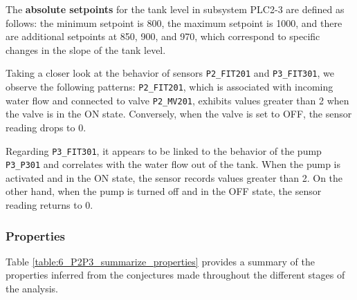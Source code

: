 The \textbf{absolute setpoints} for the tank level in subsystem PLC2-3 are defined as follows: the minimum setpoint is 800, the maximum setpoint is 1000, and there are additional setpoints at 850, 900, and 970, which correspond to specific changes in the slope of the tank level.

\bigskip
Taking a closer look at the behavior of sensors \texttt{P2\_FIT201} and \texttt{P3\_FIT301}, we observe the following patterns: \texttt{P2\_FIT201}, which is associated with incoming water flow and connected to valve \texttt{P2\_MV201}, exhibits values greater than 2 when the valve is in the ON state. Conversely, when the valve is set to OFF, the sensor reading drops to 0.

Regarding \texttt{P3\_FIT301}, it appears to be linked to the behavior of the pump \texttt{P3\_P301} and correlates with the water flow out of the tank. When the pump is activated and in the ON state, the sensor records values greater than 2. On the other hand, when the pump is turned off and in the OFF state, the sensor reading returns to 0.

\begin{comment}
\begin{figure}[ht]
	\centering
	\texttt{[image: chap6/business\_process\_P2P3a.png]}
	\caption{Activity diagram for PLC2-3}
	\label{fig:6_P2P3_process_mining}
\end{figure}
\end{comment}

\vfill

\subsubsection{Properties}
\label{subsubsec:6_P2P3_summary_table}
Table \ref{table:6_P2P3_summarize_properties} provides a summary of the properties inferred from the conjectures made throughout the different stages of the analysis.

